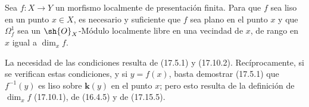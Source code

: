 \begin{proposition}[17.15.15]
\label{IV.17.15.15}
Sea $f:X\to Y$ un morfismo localmente de presentación finita. Para que $f$ sea liso en un punto $x\in X$, es necesario y suficiente que $f$ sea plano en el punto $x$ y que $\varOmega^1_f$ sea un $\sh{O}_X$-Módulo localmente libre en una vecindad de $x$, de rango en $x$ igual a $\dim_x f$.
\end{proposition}

La necesidad de las condiciones resulta de (17.5.1) y (17.10.2). Recíprocamente, si se verifican estas condiciones, y si $y=f(x)$, basta demostrar (17.5.1) que $f^{-1}(y)$ es liso sobre $\boldsymbol k(y)$ en el punto $x$; pero esto resulta de la definición de $\dim_x f$ (17.10.1), de (16.4.5) y de (17.15.5).
